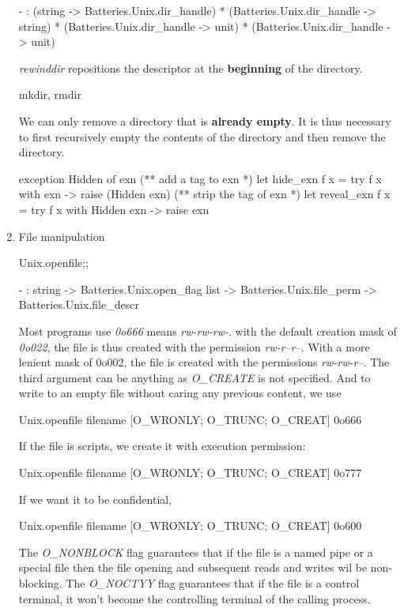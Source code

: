 \begin{enumerate}
\begin{bluecode}
- : (string -> Batteries.Unix.dir_handle) *
    (Batteries.Unix.dir_handle -> string) *
    (Batteries.Unix.dir_handle -> unit) * (Batteries.Unix.dir_handle -> unit)  
  \end{bluecode}

  \textit{rewinddir} repositions the descriptor at the \textbf{beginning} of
  the directory.

  \begin{bluecode}
    mkdir, rmdir
  \end{bluecode}
  We can only remove a directory that is \textbf{already empty}. It is
  thus necessary to first recursively empty the contents of the
  directory and then remove the directory.

  \begin{bluecode}
exception Hidden of exn 
(** add a tag to exn *)
let hide_exn f x = try f x with exn -> raise (Hidden exn)
(** strip the tag of exn *)
let reveal_exn f x = try f x with Hidden exn -> raise exn 
\end{bluecode}
\item  File manipulation \\

  \begin{alternate}
Unix.openfile;;    
\end{alternate}

\begin{bluecode}
- : string ->
    Batteries.Unix.open_flag list ->
    Batteries.Unix.file_perm -> Batteries.Unix.file_descr
  \end{bluecode}
  Most programs use \textit{0o666} means \textit{rw-rw-rw-}. with the default
  creation mask of \textit{0o022}, the file is thus created with the permission
  \textit{rw-r--r--}. With a more lenient mask of 0o002, the file is
  created with the permissions \textit{rw-rw-r--}. The third argument
  can be anything as \textit{O\_CREATE} is not specified.
  And to write to an empty file without caring any previous content,
  we use
  \begin{bluecode}
    Unix.openfile filename [O_WRONLY; O_TRUNC; O_CREAT] 0o666
  \end{bluecode}
  If the file is scripts, we create it with execution permission:
  \begin{bluecode}
    Unix.openfile filename [O_WRONLY; O_TRUNC; O_CREAT] 0o777
  \end{bluecode}
  If we want it to be confidential,
  \begin{bluecode}
    Unix.openfile filename [O_WRONLY; O_TRUNC; O_CREAT] 0o600
  \end{bluecode}
  The \textit{O\_NONBLOCK} flag guarantees that if the file is a named pipe or a
  special file then the file opening and subsequent reads and writes
  wil be non-blocking. The \textit{O\_NOCTYY} flag guarantees that if
  the file is a control terminal, it won't become the controlling
  terminal of the calling process.


\end{enumerate}

